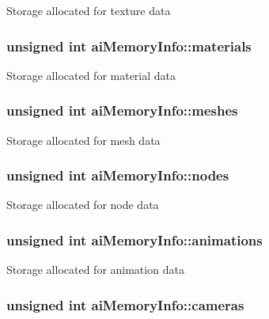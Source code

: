 Storage allocated for texture data \hypertarget{structai_memory_info_08b2ccd0cef8dec36e47fc1beeb168f1}{
\subsubsection[materials]{\setlength{\rightskip}{0pt plus 5cm}unsigned int {\bf aiMemoryInfo::materials}}}
\label{structai_memory_info_08b2ccd0cef8dec36e47fc1beeb168f1}


Storage allocated for material data \hypertarget{structai_memory_info_c24ed2b3c141f043765b6e34783d1e24}{
\subsubsection[meshes]{\setlength{\rightskip}{0pt plus 5cm}unsigned int {\bf aiMemoryInfo::meshes}}}
\label{structai_memory_info_c24ed2b3c141f043765b6e34783d1e24}


Storage allocated for mesh data \hypertarget{structai_memory_info_5a084942c81a29f7bb03c9903430b033}{
\subsubsection[nodes]{\setlength{\rightskip}{0pt plus 5cm}unsigned int {\bf aiMemoryInfo::nodes}}}
\label{structai_memory_info_5a084942c81a29f7bb03c9903430b033}


Storage allocated for node data \hypertarget{structai_memory_info_f82394dc3a17a644061ed647817efa68}{
\subsubsection[animations]{\setlength{\rightskip}{0pt plus 5cm}unsigned int {\bf aiMemoryInfo::animations}}}
\label{structai_memory_info_f82394dc3a17a644061ed647817efa68}


Storage allocated for animation data \hypertarget{structai_memory_info_3ddd36d7eabcf989ab72cda2dd3ff015}{
\subsubsection[cameras]{\setlength{\rightskip}{0pt plus 5cm}unsigned int {\bf aiMemoryInfo::cameras}}}
\label{structai_memory_info_3ddd36d7eabcf989ab72cda2dd3ff015}


